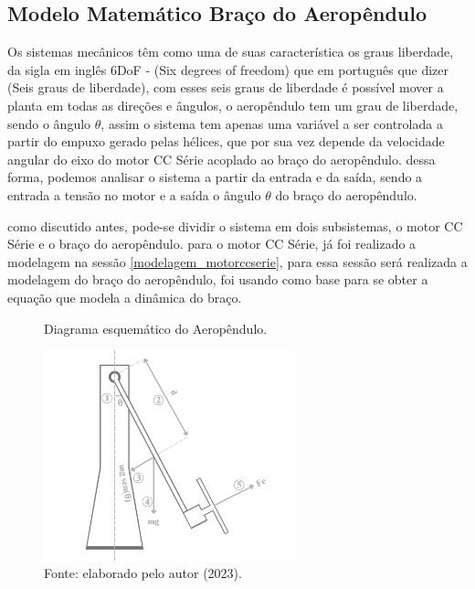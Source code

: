 \vspace{1cm}

\subsection{ Modelo Matemático Braço do Aeropêndulo}
\label{modelagem_braco_aeropendulo}

Os sistemas mecânicos têm como uma de suas característica os graus liberdade, da sigla em inglês 6DoF - (Six degrees of freedom) que em português que dizer (Seis graus de liberdade), com esses seis graus de liberdade é possível mover a planta em todas as direções e ângulos, o aeropêndulo tem um grau de liberdade, sendo o ângulo $\theta$, assim o sistema tem apenas uma variável a ser controlada a partir do empuxo gerado pelas hélices, que por sua vez depende da velocidade angular do eixo do motor CC Série acoplado ao braço do aeropêndulo. dessa forma, podemos analisar o sistema a partir da entrada e da saída, sendo a entrada a tensão no motor e a saída o ângulo $\theta$ do braço do aeropêndulo.

como discutido antes, pode-se dividir o sistema em dois subsistemas, o motor CC Série e o braço do aeropêndulo. para o motor CC Série, já foi realizado a modelagem na sessão \ref{modelagem_motorccserie}, para essa sessão será realizada a modelagem do braço do aeropêndulo, \cite{amin} foi usando como base para se obter a equação que modela a dinâmica do braço.

\begin{figure}[!h]
	\centering
	\caption{Diagrama esquemático do Aeropêndulo.}
	\includegraphics[width=0.65\textwidth]{Capitulos/4_desenvolvimento/4_figuras/desenho_aeropendulo.pdf}
	\caption*{Fonte: elaborado pelo autor (2023).}
        \label{fig4:image_04}
\end{figure}



